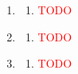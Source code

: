 \begin{enumerate}[label=(\roman*)]
    \item 

        \begin{multicols}{2}
        \begin{enumerate}[label=(\alph*)]
            \setlength\itemsep{0em}
            \item \textcolor{red}{TODO} 
        \end{enumerate}
        \end{multicols}

    \item 

        \begin{multicols}{2}
        \begin{enumerate}[label=(\alph*)]
            \setlength\itemsep{0em}
            \item \textcolor{red}{TODO} 
        \end{enumerate}
        \end{multicols}

    \item 

        \begin{multicols}{2}
        \begin{enumerate}[label=(\alph*)]
            \setlength\itemsep{0em}
            \item \textcolor{red}{TODO} 
        \end{enumerate}
        \end{multicols}

\end{enumerate}

